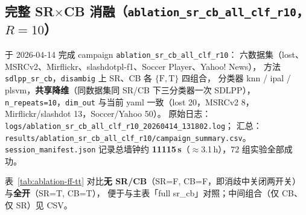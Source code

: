 \documentclass[11pt,a4paper]{article}
\begin{document}
\subsection{完整 SR$\times$CB 消融（\texttt{ablation\_sr\_cb\_all\_clf\_r10}，$R{=}10$）}
\label{sec:ablation-full}

于 2026-04-14 完成 campaign \texttt{ablation\_sr\_cb\_all\_clf\_r10}：
六数据集（lost、MSRCv2、Mirflickr、slashdotpl-f1、Soccer Player、Yahoo! News），
方法 \texttt{sdlpp\_sr\_cb}，\texttt{disambig} 上 SR、CB 各 $\{\mathrm{F},\mathrm{T}\}$ 四组合，
分类器 knn / ipal / plsvm，\textbf{共享降维}（同数据集同 SR/CB 下三分类器一次 SDLPP），
\texttt{n\_repeats=10}，\texttt{dim\_out} 与当前 yaml 一致（lost 20，MSRCv2 8，Mirflickr/slashdot 13，Soccer/Yahoo 50）。
原始日志：\texttt{logs/ablation\_sr\_cb\_all\_clf\_r10\_20260414\_131802.log}；
汇总：\texttt{results/ablation\_sr\_cb\_all\_clf\_r10/campaign\_summary.csv}。
\texttt{session\_manifest.json} 记录总墙钟约 \textbf{11115\,s}（$\approx$3.1\,h），72 组实验全部成功。

表~\ref{tab:ablation-ff-tt} 对比\textbf{无 SR/CB}（SR=F, CB=F，即消歧中关闭两开关）与\textbf{全开}（SR=T, CB=T），
便于与主表「full sr\_cb」对照；中间组合（仅 CB、仅 SR）见 CSV。
\end{document}
